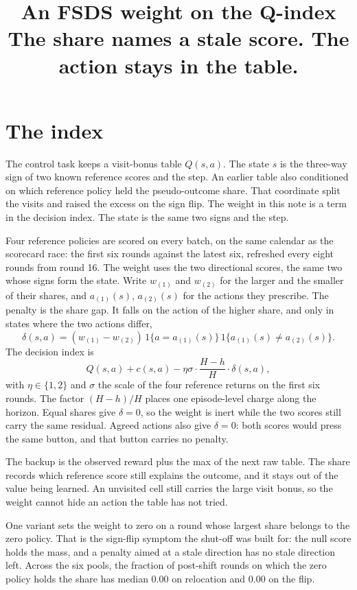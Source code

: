 \documentclass[11pt]{article}
\title{An FSDS weight on the Q-index\\
\large The share names a stale score. The action stays in the table.}
\author{}
\date{}
\begin{document}
\maketitle

\section{The index}

The control task keeps a visit-bonus table \(Q(s,a)\). The state \(s\) is the
three-way sign of two known reference scores and the step. An earlier table
also conditioned on which reference policy held the pseudo-outcome share.
That coordinate split the visits and raised the excess on the sign flip.
The weight in this note is a term in the decision index. The state is the
same two signs and the step.

Four reference policies are scored on every batch, on the same calendar as
the scorecard race: the first six rounds against the latest six, refreshed
every eight rounds from round 16. The weight uses the two directional
scores, the same two whose signs form the state. Write \(w_{(1)}\) and
\(w_{(2)}\) for the larger and the smaller of their shares, and
\(a_{(1)}(s)\), \(a_{(2)}(s)\) for the actions they prescribe. The
penalty is the share gap. It falls on the action of the higher share, and
only in states where the two actions differ,
\[
\delta(s,a)=(w_{(1)}-w_{(2)})\,1\{a=a_{(1)}(s)\}\,1\{a_{(1)}(s)\neq a_{(2)}(s)\}.
\]
The decision index is
\[
Q(s,a)+c(s,a)-\eta\sigma\cdot\frac{H-h}{H}\cdot\delta(s,a),
\]
with \(\eta\in\{1,2\}\) and \(\sigma\) the scale of the four reference
returns on the first six rounds. The factor \((H-h)/H\) places one
episode-level charge along the horizon. Equal shares give \(\delta=0\), so
the weight is inert while the two scores still carry the same residual.
Agreed actions also give \(\delta=0\): both scores would press the same
button, and that button carries no penalty.

The backup is the observed reward plus the max of the next raw table. The
share records which reference score still explains the outcome, and it stays
out of the value being learned. An unvisited cell still carries the large
visit bonus, so the weight cannot hide an action the table has not tried.

One variant sets the weight to zero on a round whose largest share belongs
to the zero policy. That is the sign-flip symptom the shut-off was built
for: the null score holds the mass, and a penalty aimed at a stale direction
has no stale direction left. Across the six pools, the fraction of
post-shift rounds on which the zero policy holds the share has median
0.00 on relocation and 0.00
on the flip.
\end{document}
